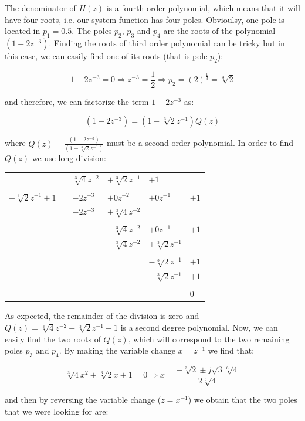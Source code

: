\documentclass[a4paper,11pt,oneside]{article}
\begin{document}
The denominator of $H(z)$ is a fourth order polynomial, which means that it will have four roots, i.e. our system function has four poles. Obvioulsy, one pole is located in $p_1=0.5$. The poles $p_2$, $p_3$ and $p_4$ are the roots of the polynomial $(1-2z^{-3})$. Finding the roots of third order polynomial can be tricky but in this case, we can easily find one of its roots (that is pole $p_2$):

\[
1-2z^{-3} = 0 \Rightarrow z^{-3}=\frac{1}{2}  \Rightarrow p_{2}=(2)^{\frac{1}{3}}=\sqrt[3]{2}
\]

and therefore, we can factorize the term $1-2z^{-3}$ as:

\[
(1-2z^{-3})=(1-\sqrt[3]{2}z^{-1})Q(z)
\]

where $Q(z)=\frac{(1-2z^{-3})}{(1-\sqrt[3]{2}z^{-1})}$ must be a second-order polynomial. In order to find $Q(z)$ we use long division:

\begin{tabular}{r|cllll}
&\qquad& $\sqrt[3]{4}z^{-2}$ & $+\sqrt[3]{2}z^{-1}$ & $+1$&\\
\cline{2-6}
\\
$-\sqrt[3]{2}z^{-1}+1$ && $-2z^{-3}$ & $+0z^{-2}$&$+0z^{-1}$&$+1$\\
&& $-2z^{-3}$ & $+\sqrt[3]{4}z^{-2}$&&\\
\cline{3-6}\\
&&&$-\sqrt[3]{4}z^{-2}$&$+0z^{-1}$&$+1$\\
&&&$-\sqrt[3]{4}z^{-2}$&$+\sqrt[3]{2}z^{-1}$&\\
\cline{4-6}\\
&&&&$-\sqrt[3]{2}z^{-1}$&$+1$\\
&&&&$-\sqrt[3]{2}z^{-1}$&$+1$\\
\cline{5-6}\\
&&&&&$0$\\
\end{tabular}

As expected, the remainder of the division is zero and $Q(z)=\sqrt[3]{4}z^{-2}+\sqrt[3]{2}z^{-1}+1$ is a second degree polynomial. Now, we can easily find the two roots of $Q(z)$, which will correspond to the two remaining poles $p_3$ and $p_4$. By making the variable change $x=z^{-1}$ we find that:

\[
\sqrt[3]{4}x^{2}+\sqrt[3]{2}x+1=0 \Rightarrow x = \frac{-\sqrt[3]{2}\pm j\sqrt{3}\sqrt[6]{4}}{2\sqrt[3]{4}}
\]

and then by reversing the variable change ($z=x^{-1}$) we obtain that the two poles that we were looking for are:
\end{document}
